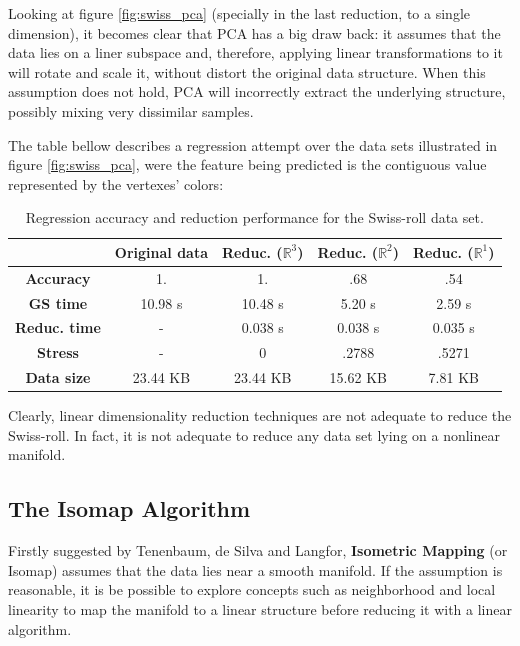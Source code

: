 \documentclass[12pt]{article}
\begin{document}
Looking at figure \ref{fig:swiss_pca} (specially in the last reduction, to a single dimension), it becomes clear that PCA has a big draw back: it assumes that the data lies on a liner subspace \cite{cay2005} and, therefore, applying linear transformations to it will rotate and scale it, without distort the original data structure. When this assumption does not hold, PCA will incorrectly extract the underlying structure, possibly mixing very dissimilar samples.

The table bellow describes a regression attempt over the data sets illustrated in figure \ref{fig:swiss_pca}, were the feature being predicted is the contiguous value represented by the vertexes' colors:

\begin{table}[H]
	\centering
	\begin{tabular}{|c|c|c|c|c|}
		\hline
		& \textbf{Original data} & \textbf{Reduc. ($\mathbb{R}^3$)} & \textbf{Reduc. ($\mathbb{R}^2$)} & \textbf{Reduc. ($\mathbb{R}^1$)} \\\hline
		\textbf{Accuracy} & 1. & 1. & .68 & .54 \\\hline
		\textbf{GS time}  & 10.98 s & 10.48 s & 5.20 s & 2.59 s \\\hline
		\textbf{Reduc. time} & - & 0.038 s & 0.038 s & 0.035 s \\\hline
		\textbf{Stress} & - & 0 & .2788 & .5271 \\\hline		
		\textbf{Data size} & 23.44 KB & 23.44 KB & 15.62 KB  & 7.81 KB \\\hline
	\end{tabular}

	\captionsetup{justification=centering}
	\caption{Regression accuracy and reduction performance for the Swiss-roll data set.}
\end{table}

Clearly, linear dimensionality reduction techniques are not adequate to reduce the Swiss-roll. In fact, it is not adequate to reduce any data set lying on a nonlinear manifold.

\subsection{The Isomap Algorithm}

Firstly suggested by Tenenbaum, de Silva and Langfor, \textbf{Isometric Mapping} (or Isomap) assumes that the data lies near a smooth manifold. If the assumption is reasonable, it is be possible to explore concepts such as neighborhood and local linearity to map the manifold to a linear structure before reducing it with a linear algorithm.
\end{document}
